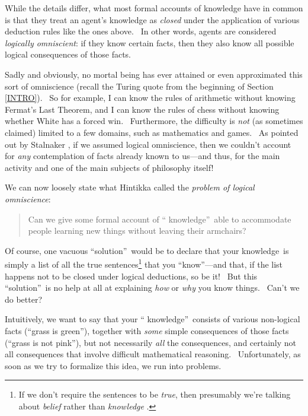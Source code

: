 \documentclass[12pt,onecolumn]{article}%
\begin{document}
While the details differ, what most formal accounts of knowledge have in
common is that they treat an agent's knowledge as \textit{closed} under the
application of various deduction rules like the ones above. \ In other words,
agents are considered \textit{logically omniscient}: if they know certain
facts, then they also know all possible logical consequences of those facts.

Sadly and obviously, no mortal being has ever attained or even approximated
this sort of omniscience (recall the Turing quote from the beginning of
Section \ref{INTRO}). \ So for example, I can know the rules of arithmetic
without knowing Fermat's Last Theorem, and I can know the rules of chess
without knowing whether White has a forced win. \ Furthermore, the difficulty
is \textit{not} (as sometimes claimed) limited to a few domains, such as
mathematics and games. \ As pointed out by Stalnaker \cite{stalnaker}, if we
assumed logical omniscience, then we couldn't account for \textit{any}
contemplation of facts already known to us---and thus, for the main activity
and one of the main subjects of philosophy itself!

We can now loosely state what Hintikka \cite{hintikka} called the
\textit{problem of logical omniscience}:

\begin{quotation}
\noindent Can we give some formal account of \textquotedblleft
knowledge\textquotedblright\ able to accommodate people learning new things
without leaving their armchairs?
\end{quotation}

Of course, one vacuous \textquotedblleft solution\textquotedblright\ would be
to declare that your knowledge\ is simply a list of all the true
sentences\footnote{If we don't require the sentences to be \textit{true}, then
presumably we're talking about \textit{belief} rather than \textit{knowledge}%
.} that you \textquotedblleft know\textquotedblright---and that, if the list
happens not to be closed under logical deductions, so be it! \ But this
\textquotedblleft solution\textquotedblright\ is no help at all at explaining
\textit{how} or \textit{why} you know things. \ Can't we do better?

Intuitively, we want to say that your \textquotedblleft
knowledge\textquotedblright\ consists of various non-logical facts
(\textquotedblleft grass is green\textquotedblright), together with
\textit{some} simple consequences of those facts (\textquotedblleft grass is
not pink\textquotedblright), but not necessarily \textit{all} the
consequences, and certainly not all consequences that involve difficult
mathematical reasoning. \ Unfortunately, as soon as we try to formalize this
idea, we run into problems.
\end{document}
